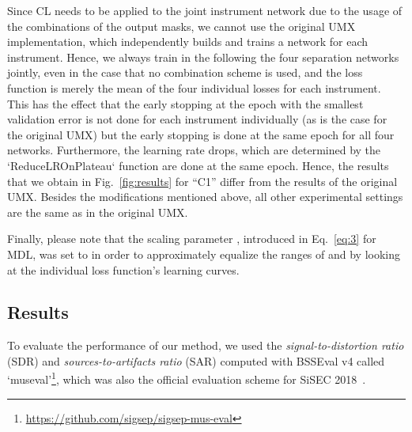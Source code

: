 \documentclass{article}
\begin{document}
Since CL needs to be applied to the joint instrument network due to the usage of the combinations of the output masks, we cannot use the original UMX implementation, which independently builds and trains a network for each instrument.
Hence, we always train in the following the four separation networks jointly, even in the case that no combination scheme is used, and the loss function is merely the mean of the four individual losses for each instrument.
This has the effect that the early stopping at the epoch with the smallest validation error is not done for each instrument individually (as is the case for the original UMX) but the early stopping is done at the same epoch for all four networks.
Furthermore, the learning rate drops, which are determined by the `ReduceLROnPlateau` function are done at the same epoch.
Hence, the results that we obtain in Fig.~\ref{fig:results} for ``C1'' differ from the results of the original UMX.
Besides the modifications mentioned above, all other experimental settings are the same as in the original UMX.


Finally, please note that the scaling parameter , introduced in Eq.~\eqref{eq:3} for MDL, was set to  in order to approximately equalize the ranges of  and  by looking at the individual loss function's learning curves.

\vspace{-1mm}
\subsection{Results}
\label{subsec:results}
\vspace{-1mm}
To evaluate the performance of our method, we used the \emph{signal-to-distortion ratio} (SDR) and \emph{sources-to-artifacts ratio} (SAR) computed with BSSEval v4 called `museval'\footnote{\url{https://github.com/sigsep/sigsep-mus-eval}}, which was also the official evaluation scheme for SiSEC 2018~\cite{stoter20182018}.
\begin{table}[tb]
\centering
\caption{Comparison of X-UMX with other public methods in terms of SDR (``median of frames, median of tracks'').}
\vspace{-2mm}
\vspace{-3.5mm}
\end{table}
\end{document}
